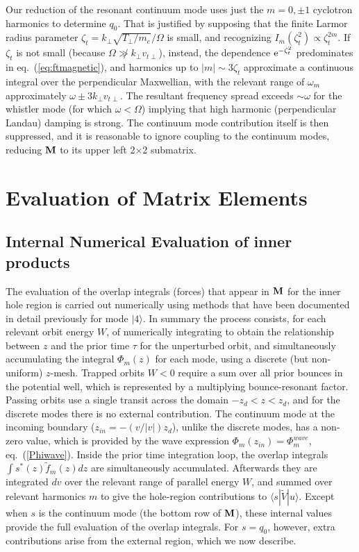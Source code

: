 \documentclass[12pt]{article}
\def\ket#1{|#1\rangle}
\def\bra#1{\langle#1}
\def\etothe#1{{\rm e}^{#1}}
\def\M{{\bf M}}
\begin{document}
Our reduction of the resonant continuum mode uses just the $m=0,\pm 1$
cyclotron harmonics to determine $q_{0}.$ That is justified by
supposing that the finite Larmor radius parameter
$\zeta_t=k_\perp\sqrt{T_\perp/m_e}/\Omega$ is small, and recognizing
$I_m(\zeta_t^2)\propto \zeta_t^{2m}$. If $\zeta_t$ is not small (because
$\Omega\not\gg k_\perp v_{t\perp}$), instead, the dependence
$\etothe{-\zeta_t^2}$ predominates in eq.\ (\ref{eq:ftmagnetic}), and
harmonics up to $|m|\sim 3\zeta_t$ approximate a continuous integral
over the perpendicular Maxwellian, with the relevant range of
$\omega_m$ approximately $\omega\pm 3k_\perp v_{t\perp}$. The
resultant frequency spread exceeds $\sim\omega$ for the whistler mode
(for which $\omega < \Omega$) implying that high harmonic
(perpendicular Landau) damping is strong. The continuum mode
contribution itself is then suppressed, and it is reasonable to ignore
coupling to the continuum modes, reducing $\M$ to its upper left
2$\times$2 submatrix.

\section{Evaluation of Matrix Elements}
\subsection{Internal Numerical Evaluation of inner products}

The evaluation of the overlap integrals (forces) that appear in $\M$
for the inner hole region is carried out numerically using methods
that have been documented in detail previously\cite{Hutchinson2018a}
for mode $\ket{4}$. In summary the process consists, for each relevant
orbit energy $W$, of numerically integrating to obtain the
relationship between $z$ and the prior time $\tau$ for the unperturbed
orbit, and simultaneously accumulating the integral $\Phi_m(z)$ for
each mode, using a discrete (but non-uniform) $z$-mesh.  Trapped
orbits $W<0$ require a sum over all prior bounces in the potential
well, which is represented by a multiplying bounce-resonant
factor. Passing orbits use a single transit across the domain
$-z_d<z<z_d$, and for the discrete modes there is no external
contribution. The continuum mode at the incoming boundary
($z_{in}=-(v/|v|)z_d$), unlike the discrete modes, has a non-zero
value, which is provided by the wave expression
$\Phi_m(z_{in})=\Phi_m^{wave}$, eq.\ (\ref{Phiwave}).  Inside the
prior time integration loop, the overlap integrals
$\int s^*(z)\tilde f_m(z)dz$ are simultaneously
accumulated. Afterwards they are integrated $dv$ over the relevant
range of parallel energy $W$, and summed over relevant harmonics $m$
to give the hole-region contributions to $\bra{s}|\tilde
V\ket{u}$. Except when $s$ is the continuum mode (the bottom row of
$\M$), these internal values provide the full evaluation of the
overlap integrals. For $s=q_0$, however, extra contributions arise
from the external region, which we now describe.
\end{document}
